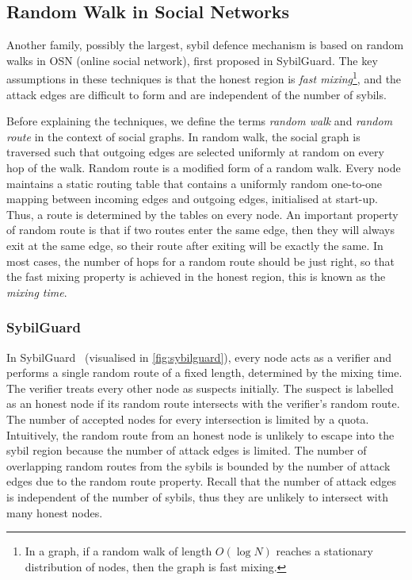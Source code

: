 \subsection{Random Walk in Social Networks}\label{sec:random-walk}
Another family, possibly the largest, sybil defence mechanism is based on random
walks in OSN (online social network), first proposed in
SybilGuard\cite{yu2006sybilguard}. The key assumptions in these techniques is
that the honest region is \emph{fast mixing}\footnote{In a graph, if a random
  walk of length $O(\log{N})$ reaches a stationary distribution of nodes, then
  the graph is fast mixing.}, and the attack edges are difficult to form and are
independent of the number of sybils.


Before explaining the techniques, we define the terms \emph{random walk} and
\emph{random route} in the context of social graphs. In random walk, the social
graph is traversed such that outgoing edges are selected uniformly at random on
every hop of the walk. Random route is a modified form of a random walk. Every
node maintains a static routing table that contains a uniformly random
one-to-one mapping between incoming edges and outgoing edges, initialised at
start-up. Thus, a route is determined by the tables on every node. An important
property of random route is that if two routes enter the same edge, then they
will always exit at the same edge, so their route after exiting will be exactly
the same. In most cases, the number of hops for a random route should be just
right, so that the fast mixing property is achieved in the honest region, this
is known as the \emph{mixing time}.

\subsubsection{SybilGuard}
In SybilGuard~\cite{yu2006sybilguard} (visualised in \autoref{fig:sybilguard}),
every node acts as a verifier and performs a single random route of a fixed
length, determined by the mixing time. The verifier treats every other node as
suspects initially. The suspect is labelled as an honest node if its random
route intersects with the verifier's random route. The number of accepted nodes
for every intersection is limited by a quota. Intuitively, the random route from
an honest node is unlikely to escape into the sybil region because the number of
attack edges is limited. The number of overlapping random routes from the sybils
is bounded by the number of attack edges due to the random route property.
Recall that the number of attack edges is independent of the number of sybils,
thus they are unlikely to intersect with many honest nodes.

